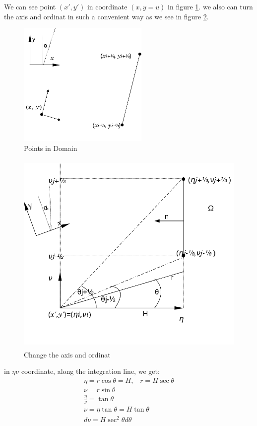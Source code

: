 \documentclass[a4paper,12pt]{article}
\begin{document}
We can see point $(x',y')$ in coordinate $(x,y=u)$ in figure \ref{PointsDomain}. we also can turn the axis and ordinat in such a convenient way as we see in figure \ref{turnAxis}. 
\begin{figure}[!htbp]
\begin{center}
\includegraphics[height = 6cm]{positionOfPoints1.png}
\end{center}
 \caption{Points in Domain}\label{PointsDomain}
\end{figure}
\begin{figure}[!htbp]
\begin{center}
\includegraphics[height = 10cm]{changeAxis.png}
\end{center}
 \caption{Change the axis and ordinat}\label{turnAxis}
\end{figure}
in $\eta\nu$ coordinate, along the integration line, we get:
\begin{align}
 \eta=r \cos \theta=H\text{,}  \quad r=H\sec\theta\\
\nu= r\sin \theta\\
\frac{\eta}{\nu}= \tan\theta\\
\nu=\eta \tan \theta=H\tan \theta\\
d\nu=H \sec^2\theta d\theta
\end{align}
\end{document}
